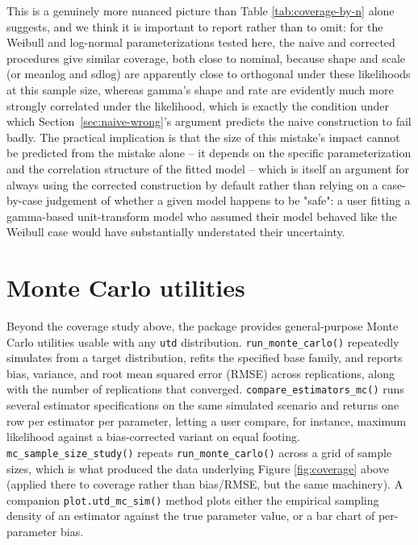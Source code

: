This is a genuinely more nuanced picture than Table
\ref{tab:coverage-by-n} alone suggests, and we think it is important to
report rather than to omit: for the Weibull and log-normal
parameterizations tested here, the naive and corrected procedures give
similar coverage, both close to nominal, because shape and scale (or
meanlog and sdlog) are apparently close to orthogonal under these
likelihoods at this sample size, whereas gamma's shape and rate are
evidently much more strongly correlated under the likelihood, which is
exactly the condition under which Section~\ref{sec:naive-wrong}'s argument predicts the
naive construction to fail badly. The practical implication is that the
size of this mistake's impact cannot be predicted from the mistake
alone -- it depends on the specific parameterization and the
correlation structure of the fitted model -- which is itself an
argument for always using the corrected construction by default rather
than relying on a case-by-case judgement of whether a given model
happens to be "safe": a user fitting a gamma-based unit-transform model
who assumed their model behaved like the Weibull case would have
substantially understated their uncertainty.

\section{Monte Carlo utilities}
\label{sec:montecarlo}

Beyond the coverage study above, the package provides general-purpose
Monte Carlo utilities usable with any \texttt{utd} distribution.
\texttt{run\_monte\_carlo()} repeatedly simulates from a target
distribution, refits the specified base family, and reports bias,
variance, and root mean squared error (RMSE) across replications, along
with the number of replications that converged. \texttt{compare\_estimators\_mc()}
runs several estimator specifications on the same simulated scenario and
returns one row per estimator per parameter, letting a user compare,
for instance, maximum likelihood against a bias-corrected variant on
equal footing. \texttt{mc\_sample\_size\_study()} repeats
\texttt{run\_monte\_carlo()} across a grid of sample sizes, which is
what produced the data underlying Figure \ref{fig:coverage} above
(applied there to coverage rather than bias/RMSE, but the same
machinery). A companion \texttt{plot.utd\_mc\_sim()} method plots either
the empirical sampling density of an estimator against the true
parameter value, or a bar chart of per-parameter bias.

